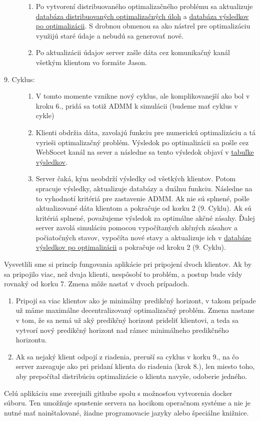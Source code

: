 \begin{description}
{\begin{enumerate}
{		}
		\item{
			Po vytvorení distribuovaného optimalizačného problému sa aktualizuje \hyperref[DB:WORKER]{databáza distribuovaných optimalizačných úloh} a \hyperref[DB:WORKER_DATA]{databáza výsledkov po optimalizácii}. S drobnou obmenou sa ako nástrel pre optimalizáciu využijú staré údaje a nebudú sa generovať nové. 
		}
		\item{
			Po aktualizácii údajov server zašle dáta cez komunikačný kanál všetkým klientom vo formáte Jason.
		}
	\end{enumerate}
}
\item[9. Cyklus:]{\hfill
	\begin{enumerate}
		\item{V tomto momente vznikne nový cyklus, ale komplikovanejší ako bol v kroku 6., pridá sa totiž ADMM k simulácii (budeme mať cyklus v cykle)}
		\item{Klienti obdržia dáta, zavolajú funkciu pre numerickú optimalizáciu a tá vyrieši optimalizačný problém. Výsledok po optimalizácii sa pošle cez WebSocet kanál na sever a následne sa tento výsledok objaví v \hyperref[fig:Tabulka]{tabuľke výsledkov}.}
		\item{
			Server čaká, kým neobdrží výsledky od všetkých klientov. Potom spracuje výsledky, aktualizuje databázy a duálnu funkciu. Následne na to vyhodnotí kritériá pre zastavenie ADMM. Ak nie sú splnené, pošle aktualizované dáta klientom a pokračuje od korku 2 (9. Cyklu). Ak sú kritériá splnené, považujeme výsledok za optimálne akčné zásahy. Ďalej server zavolá simuláciu pomocou vypočítaných akčných zásahov a počiatočných stavov, vypočíta nové stavy a aktualizuje ich v \hyperref[DB:WORKER_DATA]{databáze výsledkov po optimalizácii} a pokračuje od kroku 2 (9. Cyklu).
		}
	\end{enumerate}
}
\end{description}
Vysvetlili sme si princíp fungovania aplikácie pri pripojení dvoch klientov. Ak by sa pripojilo viac, než dvaja klienti, nespôsobí to problém, a postup bude vždy rovnaký od korku 7. Zmena môže nastať v dvoch prípadoch.
\begin{enumerate}
	\item{
	 Pripojí sa viac klientov ako je minimálny predikčný horizont, v takom prípade už máme maximálne decentralizovaný optimalizačný problém. Zmena nastane v tom, že sa nemá už aký predikčný horizont prideliť klientovi, a teda sa vytvorí nový predikčný horizont nad rámec minimálneho predikčného horizontu.
	}
	\item{
	Ak sa nejaký klient odpojí z riadenia, preruší sa cyklus v korku 9., na čo server zareaguje ako pri pridaní klienta do riadenia (krok 8.), len miesto toho, aby prepočítal distribúciu optimalizácie o klienta navyše, odoberie jedného. 
	}
\end{enumerate}
Celú aplikáciu sme zverejnili githube spolu s možnosťou vytvorenia docker súboru.  Ten umožňuje spustenie servera na hocikom operačnom systéme a nie je nutné mať nainštalované, žiadne programovacie jazyky alebo špeciálne knižnice.

